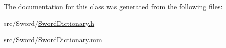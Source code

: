 The documentation for this class was generated from the following files\-:\begin{DoxyCompactItemize}
\item 
src/\-Sword/\hyperlink{_sword_dictionary_8h}{Sword\-Dictionary.\-h}\item 
src/\-Sword/\hyperlink{_sword_dictionary_8mm}{Sword\-Dictionary.\-mm}\end{DoxyCompactItemize}
